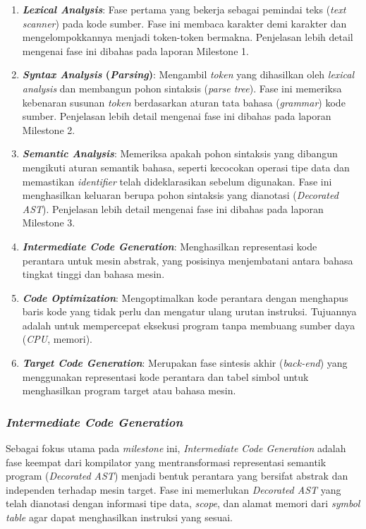 \documentclass[12pt,a4paper]{article}
\begin{document}
\begin{enumerate}
    \item \textbf{\textit{Lexical Analysis}}: Fase pertama yang bekerja sebagai
        pemindai teks (\textit{text scanner}) pada kode sumber. Fase ini
        membaca karakter demi karakter dan mengelompokkannya menjadi token-token
        bermakna. Penjelasan lebih detail mengenai fase ini dibahas pada
        laporan Milestone 1.
    \item \textbf{\textit{Syntax Analysis} (\textit{Parsing})}: Mengambil
        \textit{token} yang dihasilkan oleh \textit{lexical analysis} dan
        membangun pohon sintaksis (\textit{parse tree}). Fase ini memeriksa
        kebenaran susunan \textit{token} berdasarkan aturan tata bahasa
        (\textit{grammar}) kode sumber. Penjelasan lebih detail mengenai fase ini
        dibahas pada laporan Milestone 2.
    \item \textbf{\textit{Semantic Analysis}}: Memeriksa apakah pohon sintaksis
        yang dibangun mengikuti aturan semantik bahasa, seperti kecocokan
        operasi tipe data dan memastikan \textit{identifier} telah
        dideklarasikan sebelum digunakan. Fase ini menghasilkan keluaran berupa
        pohon sintaksis yang dianotasi (\textit{Decorated AST}). Penjelasan
        lebih detail mengenai fase ini dibahas pada laporan Milestone 3.
    \item \textbf{\textit{Intermediate Code Generation}}: Menghasilkan
        representasi kode perantara untuk mesin abstrak, yang posisinya
        menjembatani antara bahasa tingkat tinggi dan bahasa mesin.
    \item \textbf{\textit{Code Optimization}}: Mengoptimalkan kode perantara
        dengan menghapus baris kode yang tidak perlu dan mengatur ulang urutan
        instruksi. Tujuannya adalah untuk mempercepat eksekusi program tanpa
        membuang sumber daya (\textit{CPU}, memori).
    \item \textbf{\textit{Target Code Generation}}: Merupakan fase sintesis
        akhir (\textit{back-end}) yang menggunakan representasi kode perantara dan
        tabel simbol untuk menghasilkan program target atau bahasa mesin.
\end{enumerate}

\subsubsection{\textit{Intermediate Code Generation}}

Sebagai fokus utama pada \textit{milestone} ini, \textit{Intermediate Code
Generation} adalah fase keempat dari kompilator yang mentransformasi
representasi semantik program (\textit{Decorated AST}) menjadi bentuk perantara
yang bersifat abstrak dan independen terhadap mesin target. Fase ini
memerlukan \textit{Decorated AST} yang telah dianotasi dengan informasi tipe
data, \textit{scope}, dan alamat memori dari \textit{symbol table} agar dapat
menghasilkan instruksi yang sesuai.
\end{document}

